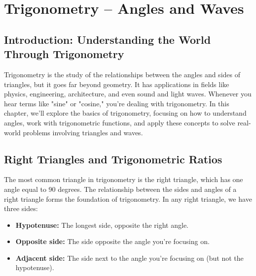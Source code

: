 \chapter{Trigonometry – Angles and Waves}

\section{Introduction: Understanding the World Through Trigonometry}
Trigonometry is the study of the relationships between the angles and sides of triangles, but it goes far beyond geometry. It has applications in fields like physics, engineering, architecture, and even sound and light waves. Whenever you hear terms like "sine" or "cosine," you're dealing with trigonometry.
In this chapter, we’ll explore the basics of trigonometry, focusing on how to understand angles, work with trigonometric functions, and apply these concepts to solve real-world problems involving triangles and waves.

\section{Right Triangles and Trigonometric Ratios}
The most common triangle in trigonometry is the right triangle, which has one angle equal to 90 degrees. The relationship between the sides and angles of a right triangle forms the foundation of trigonometry.
In any right triangle, we have three sides:
\begin{itemize}
    \item \textbf{Hypotenuse:} The longest side, opposite the right angle.
    \item \textbf{Opposite side:} The side opposite the angle you’re focusing on.
    \item \textbf{Adjacent side:} The side next to the angle you’re focusing on (but not the hypotenuse).
\end{itemize}

\begin{center}
\end{center}


